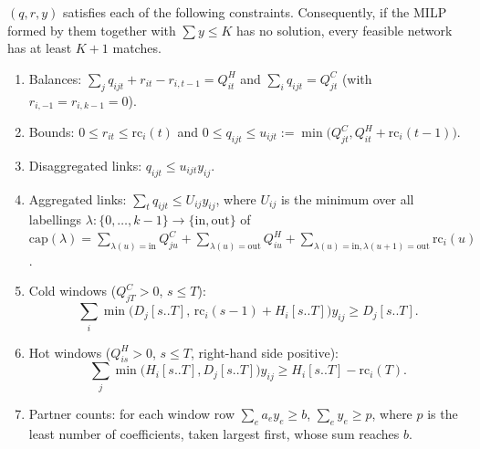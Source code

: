 \documentclass[11pt,a4paper]{report}
\begin{document}
\begin{proposition}\label{prop:rows}
$(q,r,y)$ satisfies each of the following constraints. Consequently, if the MILP formed by them together with
$\sum y\le K$ has no solution, every feasible network has at least $K+1$ matches.
\begin{enumerate}
\item Balances: $\sum_jq_{ijt}+r_{it}-r_{i,t-1}=Q^H_{it}$ and $\sum_iq_{ijt}=Q^C_{jt}$ (with $r_{i,-1}=r_{i,k-1}=0$).
\item Bounds: $0\le r_{it}\le\mathrm{rc}_i(t)$ and $0\le q_{ijt}\le u_{ijt}:=\min\bigl(Q^C_{jt},Q^H_{it}+\mathrm{rc}_i(t-1)\bigr)$.
\item Disaggregated links: $q_{ijt}\le u_{ijt}y_{ij}$.
\item Aggregated links: $\sum_tq_{ijt}\le U_{ij}y_{ij}$, where $U_{ij}$ is the minimum over all labellings
$\lambda:\{0,\dots,k-1\}\to\{\mathrm{in},\mathrm{out}\}$ of
$\mathrm{cap}(\lambda)=\sum_{\lambda(u)=\mathrm{in}}Q^C_{ju}+\sum_{\lambda(u)=\mathrm{out}}Q^H_{iu}
+\sum_{\lambda(u)=\mathrm{in},\lambda(u+1)=\mathrm{out}}\mathrm{rc}_i(u)$.
\item Cold windows ($Q^C_{jT}>0$, $s\le T$):
\[\textstyle\sum_i\min\bigl(D_j[s..T],\,\mathrm{rc}_i(s-1)+H_i[s..T]\bigr)y_{ij}\ge D_j[s..T].\]
\item Hot windows ($Q^H_{is}>0$, $s\le T$, right-hand side positive):
\[\textstyle\sum_j\min\bigl(H_i[s..T],D_j[s..T]\bigr)y_{ij}\ge H_i[s..T]-\mathrm{rc}_i(T).\]
\item Partner counts: for each window row $\sum_ea_ey_e\ge b$, $\sum_ey_e\ge p$, where $p$ is the least number of
coefficients, taken largest first, whose sum reaches $b$.
\end{enumerate}
\end{proposition}
\end{document}
